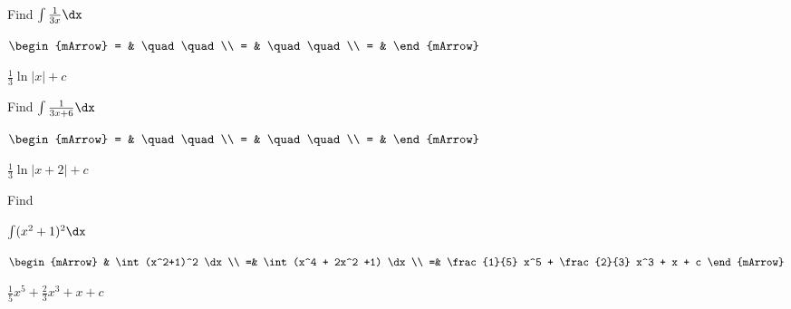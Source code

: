 \begin{mtask}[resume]
   \task \begin{exercise} Find $\int \frac{1}{3x} \dx$
           \begin{envSolution}
             $\begin{mArrow}
                 = & \quad \quad              \\
		   		 = & \quad \quad              \\
				 = &  
              \end{mArrow}$
            \begin{shortsolution}  
			     $\frac{1}{3}\ln |x| + c$
			\end{shortsolution}				 
           \end{envSolution}
         \end{exercise}

   \task \begin{exercise} Find $\int \frac{1}{3x+6} \dx$
           \begin{envSolution}
             $\begin{mArrow}
                 = & \quad \quad              \\
		   		 = & \quad \quad              \\
				 = &  
              \end{mArrow}$
            \begin{shortsolution}  
			     $\frac{1}{3}\ln |x+2| + c $
			\end{shortsolution}				 
           \end{envSolution}
         \end{exercise}


   \task \begin{exercise} \hypertarget{urlInt1}{Find} $\int (x^2+1)^2 \dx $
           \begin{envSolution}
             $\begin{mArrow}
 			       & \int (x^2+1)^2 \dx                              \\
                  =& \int (x^4 + 2x^2 +1) \dx                        \\
                  =& \frac{1}{5} x^5 + \frac{2}{3} x^3 + x + c
              \end{mArrow}$
            \begin{shortsolution}  
			     $\frac{1}{5}x^5 + \frac{2}{3} x^3 + x + c$
			\end{shortsolution}				 
           \end{envSolution}
         \end{exercise}


\end{mtask}
